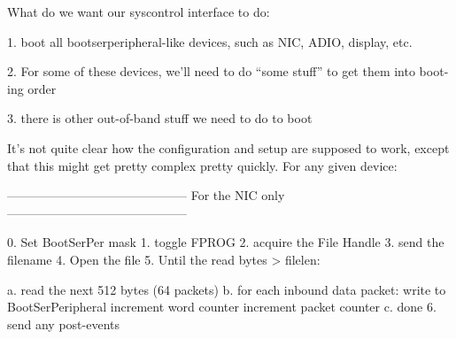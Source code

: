 
What do we want our syscontrol interface to do: 

1. boot all bootserperipheral-like devices, such as NIC, ADIO,
   display, etc.

2. For some of these devices, we'll need to do ``some stuff'' to get
   them into boot-ing order

3. there is other out-of-band stuff we need to do to boot

It's not quite clear how the configuration and setup are supposed to
work, except that this might get pretty complex pretty quickly. For
any given device:


--------------------------------------------
For the NIC only
--------------------------------------------

0. Set BootSerPer mask 
1. toggle FPROG
2. acquire the File Handle
3. send the filename
4. Open the file
5. Until the read bytes > filelen:
   
   a. read the next 512 bytes (64 packets)
   b. for each inbound data packet: 
      write to BootSerPeripheral
      increment word counter
      increment packet counter
   c. done
6. send any post-events
